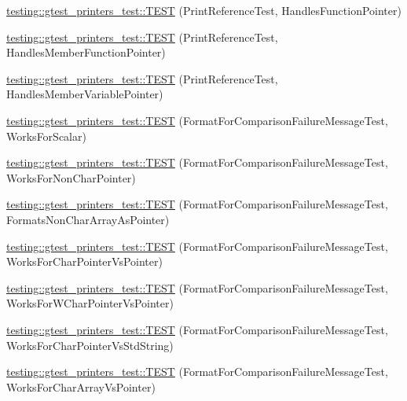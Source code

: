 \begin{DoxyCompactItemize}
\item 
\mbox{\hyperlink{namespacetesting_1_1gtest__printers__test_aab47074bb60b087e80675a44ad8c88ba}{testing\+::gtest\+\_\+printers\+\_\+test\+::\+T\+E\+ST}} (Print\+Reference\+Test, Handles\+Function\+Pointer)
\item 
\mbox{\hyperlink{namespacetesting_1_1gtest__printers__test_a88f9089e0b19be4bda74a953d6a47d7b}{testing\+::gtest\+\_\+printers\+\_\+test\+::\+T\+E\+ST}} (Print\+Reference\+Test, Handles\+Member\+Function\+Pointer)
\item 
\mbox{\hyperlink{namespacetesting_1_1gtest__printers__test_af9c63486049ac0ec2a1db65904702eb3}{testing\+::gtest\+\_\+printers\+\_\+test\+::\+T\+E\+ST}} (Print\+Reference\+Test, Handles\+Member\+Variable\+Pointer)
\item 
\mbox{\hyperlink{namespacetesting_1_1gtest__printers__test_aa7429c3701e464d0047a82686a5e8a46}{testing\+::gtest\+\_\+printers\+\_\+test\+::\+T\+E\+ST}} (Format\+For\+Comparison\+Failure\+Message\+Test, Works\+For\+Scalar)
\item 
\mbox{\hyperlink{namespacetesting_1_1gtest__printers__test_adb093d9323bfb766be8c91215c46056e}{testing\+::gtest\+\_\+printers\+\_\+test\+::\+T\+E\+ST}} (Format\+For\+Comparison\+Failure\+Message\+Test, Works\+For\+Non\+Char\+Pointer)
\item 
\mbox{\hyperlink{namespacetesting_1_1gtest__printers__test_a3571808f93f419268b6aed1aa127ea30}{testing\+::gtest\+\_\+printers\+\_\+test\+::\+T\+E\+ST}} (Format\+For\+Comparison\+Failure\+Message\+Test, Formats\+Non\+Char\+Array\+As\+Pointer)
\item 
\mbox{\hyperlink{namespacetesting_1_1gtest__printers__test_a1694d4063da702f5379495d3cb2cbc91}{testing\+::gtest\+\_\+printers\+\_\+test\+::\+T\+E\+ST}} (Format\+For\+Comparison\+Failure\+Message\+Test, Works\+For\+Char\+Pointer\+Vs\+Pointer)
\item 
\mbox{\hyperlink{namespacetesting_1_1gtest__printers__test_a735171f4ba0a9dffee9c4c7321107822}{testing\+::gtest\+\_\+printers\+\_\+test\+::\+T\+E\+ST}} (Format\+For\+Comparison\+Failure\+Message\+Test, Works\+For\+W\+Char\+Pointer\+Vs\+Pointer)
\item 
\mbox{\hyperlink{namespacetesting_1_1gtest__printers__test_ab5a910170489276c14b817b70d4feb96}{testing\+::gtest\+\_\+printers\+\_\+test\+::\+T\+E\+ST}} (Format\+For\+Comparison\+Failure\+Message\+Test, Works\+For\+Char\+Pointer\+Vs\+Std\+String)
\item 
\mbox{\hyperlink{namespacetesting_1_1gtest__printers__test_ac25834e0463cf9f3d231db24e7b220e5}{testing\+::gtest\+\_\+printers\+\_\+test\+::\+T\+E\+ST}} (Format\+For\+Comparison\+Failure\+Message\+Test, Works\+For\+Char\+Array\+Vs\+Pointer)

\end{DoxyCompactItemize}
